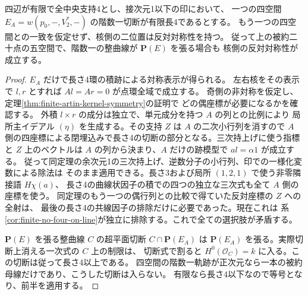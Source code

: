 \begin{proposition}\label{prop:single-quartic-slice-kernel-symmetry}
四辺が有限で全中央支持4とし、接次元1以下の印において、
一つの四空間 $E_A=w(p_0,-,V_2^*,-)$ の階数一切断が有限長4であるとする。
もう一つの四空間との一致を仮定せず、核側の二位置は反対対称性を持つ。
従って上の被約二十点の五空間で、階数一の整曲線が $\mathbf P(E)$ を張る場合も
核側の反対対称性が成立する。
\end{proposition}
\begin{proof}
$E_A$ だけで長さ4環の積跡による対称表示が得られる。
左右核をその表示で $l,r$ とすれば $A l=A r=0$ が点環全域で成立する。
奇側の非対称を仮定し、定理\ref{thm:finite-artin-kernel-symmetry}の証明で
どの偶座標が必要になるかを確認する。
外積 $l\times r$ の成分は独立で、単元成分を持つ $A$ の列との比例により
局所主イデアル $(\eta)$ を生成する。その支持 $Z$ は $A$ の二次小行列を消すので
$A$ 側の四座標による閉埋込みで長さ4の切断の部分となる。三次持上げに使う指標と
$Z$ 上のベクトルは $A$ の列から決まり、$A$ だけの跡模型で $a l=\alpha 1$ が成立する。
従って同定理の余次元1の三次持上げ、逆数分子の小行列、印での一様化変数による除法は
そのまま適用できる。長さ3および局所 $(1,2,1)$ で使う非零隣接語 $H\chi(a)$、
長さ4の曲線状因子の積での四つの独立な三次式も全て $A$ 側の座標を使う。
同定理のもう一つの偶行列との比較で得ていた反対座標の $Z$ への全射は、
最後の長さ4の共線因子の排除だけに必要であった。現在これは
系\ref{cor:finite-no-four-on-line}が独立に排除する。これで全ての選択肢が矛盾する。

$\mathbf P(E)$ を張る整曲線 $C$ の超平面切断 $C\cap\mathbf P(E_A)$ は
$\mathbf P(E_A)$ を張る。実際切断上消える一次式の $C$ 上の制限は、
切断式で割ると $H^0(\mathcal O_C)=k$ に入る。この切断は従って長さ4以上である。
四空間の階数一軌跡が正次元なら一本の被約母線だけであり、こうした切断は入らない。
有限なら長さ4以下なので等号となり、前半を適用する。
\end{proof}
